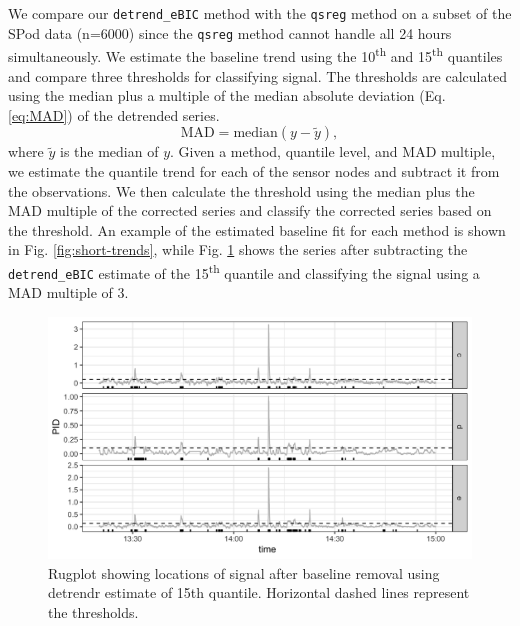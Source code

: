 \documentclass[12pt]{article}
\begin{document}
	We compare our \texttt{detrend\_eBIC} method with the \texttt{qsreg} method on a subset of the SPod data (n=6000) since the \texttt{qsreg} method cannot handle all 24 hours simultaneously. We estimate the baseline trend using the 10\textsuperscript{th} and 15\textsuperscript{th} quantiles and compare three thresholds for classifying signal. The thresholds are calculated using the median plus a multiple of the median absolute deviation (Eq. \ref{eq:MAD}) of the detrended series. 
	\begin{equation}
	\label{eq:MAD}
	\mbox{MAD} = \mbox{median}(y-\tilde{y}),
	\end{equation}
	where $\tilde{y}$ is the median of $y$. Given a method, quantile level, and MAD multiple, we estimate the quantile trend for each of the sensor nodes and subtract it from the observations. We then calculate the threshold using the median plus the MAD multiple of the corrected series and classify the corrected series based on the threshold. An example of the estimated baseline fit for each method is shown in Fig. \ref{fig:short-trends}, while Fig. \ref{fig:rugplot} shows the series after subtracting the \texttt{detrend\_eBIC} estimate of the 15\textsuperscript{th} quantile and classifying the signal using a MAD multiple of 3. 
	 
 	\begin{figure}
	 	\includegraphics[width = \linewidth]{Figures/corrected_rugplot.png}
	 	\caption{Rugplot showing locations of signal after baseline removal using detrendr estimate of 15th quantile. Horizontal dashed lines represent the thresholds.}
	 	\label{fig:rugplot}
	 \end{figure}
	 
\end{document}
